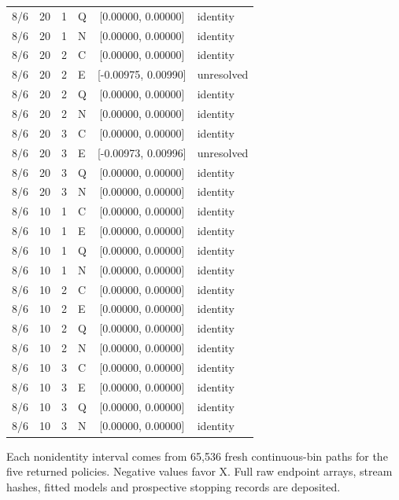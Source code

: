 \begin{longtable}{rrrlcl}
8/6 & 20 & 1 & Q & [0.00000, 0.00000] & identity \\
8/6 & 20 & 1 & N & [0.00000, 0.00000] & identity \\
8/6 & 20 & 2 & C & [0.00000, 0.00000] & identity \\
8/6 & 20 & 2 & E & [-0.00975, 0.00990] & unresolved \\
8/6 & 20 & 2 & Q & [0.00000, 0.00000] & identity \\
8/6 & 20 & 2 & N & [0.00000, 0.00000] & identity \\
8/6 & 20 & 3 & C & [0.00000, 0.00000] & identity \\
8/6 & 20 & 3 & E & [-0.00973, 0.00996] & unresolved \\
8/6 & 20 & 3 & Q & [0.00000, 0.00000] & identity \\
8/6 & 20 & 3 & N & [0.00000, 0.00000] & identity \\
8/6 & 10 & 1 & C & [0.00000, 0.00000] & identity \\
8/6 & 10 & 1 & E & [0.00000, 0.00000] & identity \\
8/6 & 10 & 1 & Q & [0.00000, 0.00000] & identity \\
8/6 & 10 & 1 & N & [0.00000, 0.00000] & identity \\
8/6 & 10 & 2 & C & [0.00000, 0.00000] & identity \\
8/6 & 10 & 2 & E & [0.00000, 0.00000] & identity \\
8/6 & 10 & 2 & Q & [0.00000, 0.00000] & identity \\
8/6 & 10 & 2 & N & [0.00000, 0.00000] & identity \\
8/6 & 10 & 3 & C & [0.00000, 0.00000] & identity \\
8/6 & 10 & 3 & E & [0.00000, 0.00000] & identity \\
8/6 & 10 & 3 & Q & [0.00000, 0.00000] & identity \\
8/6 & 10 & 3 & N & [0.00000, 0.00000] & identity \\
\end{longtable}
\endgroup
{\footnotesize Each nonidentity interval comes from 65,536 fresh continuous-bin paths for the five returned policies. Negative values favor X. Full raw endpoint arrays, stream hashes, fitted models and prospective stopping records are deposited.}
